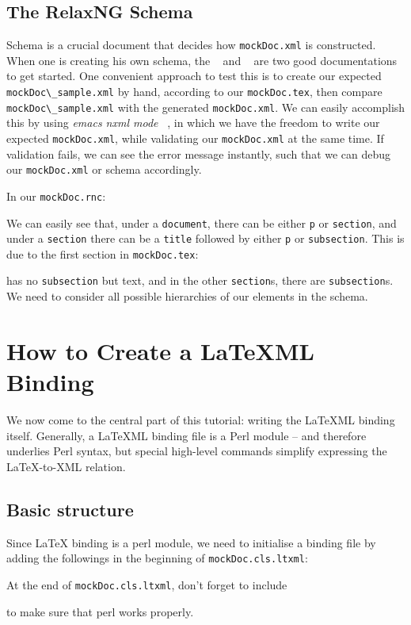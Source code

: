 \documentclass[a4paper]{article}
\def\latexml{{\LaTeX}ML\xspace}
\begin{document}
\subsection{The RelaxNG Schema}\label{sec:rnc}
Schema is a crucial document that decides how \lstinline|mockDoc.xml| is constructed. When
one is creating his own schema, the ~\cite{RelaxNG:tutorial} and ~\cite{XML:tutorial} are two
good documentations to get started. One convenient approach to test this is to create our
expected \lstinline|mockDoc\_sample.xml| by hand, according to our
\lstinline|mockDoc.tex|, then compare \lstinline|mockDoc\_sample.xml| with the generated
\lstinline|mockDoc.xml|. We can easily accomplish this by using \textit{emacs nxml
  mode} ~\cite{Emacs:nxml}, in which we have the freedom to write
our expected \lstinline|mockDoc.xml|, while validating our \lstinline|mockDoc.xml| at
the same time. If validation fails, we can see the error message instantly, such that we
can debug our \lstinline|mockDoc.xml| or schema accordingly.

In our \lstinline|mockDoc.rnc|:

We can easily see that, under a \lstinline|document|, there can be either \lstinline|p| or \lstinline|section|, and under a \lstinline|section| there can be a \lstinline|title| followed by either \lstinline|p| or \lstinline|subsection|. This is due to the first section in \lstinline|mockDoc.tex|:

has no \lstinline|subsection| but text, and in the other \lstinline|section|s, there are \lstinline|subsection|s. We need to consider all possible hierarchies of our elements in the schema.



\section{How to Create a \latexml Binding}\label{sec:bind}
We now come to the central part of this tutorial: writing the \latexml binding
itself. Generally, a \latexml binding file is a Perl module -- and therefore underlies
Perl syntax, but special high-level commands simplify expressing the {\LaTeX}-to-XML
relation.

\subsection{Basic structure}
Since {\LaTeX} binding is a perl module, we need to initialise a binding file by adding
the followings in the beginning of \lstinline|mockDoc.cls.ltxml|:

At the end of \lstinline|mockDoc.cls.ltxml|, don't forget to include

to make sure that perl works properly.
\end{document}
